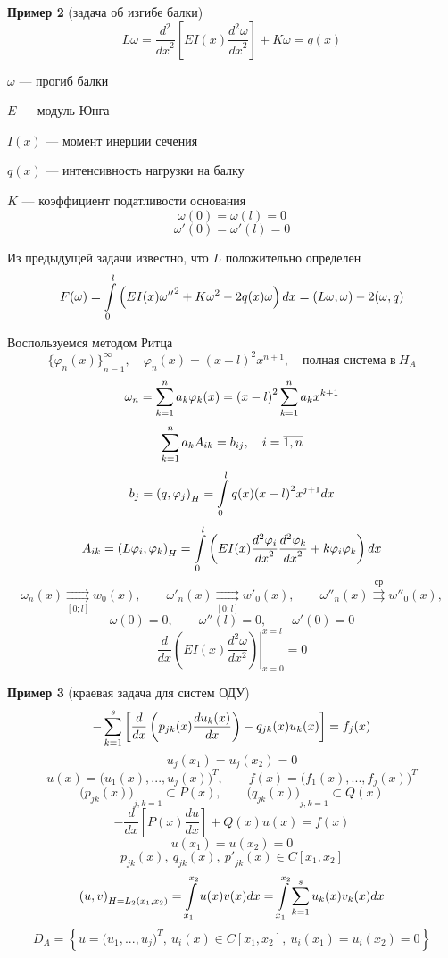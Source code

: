 \textbf{Пример 2} (задача об изгибе балки)
\[ L\omega = \frac{d^2}{{dx}^2} \left[E I(x) \frac{d^2 \omega }{{dx}^2}\right] + K\omega = q(x)\]

$ \omega $ --- прогиб балки

$ E $ --- модуль Юнга

$ I(x) $ --- момент инерции сечения

$ q(x) $ --- интенсивность нагрузки на балку

$ K $ --- коэффициент податливости основания
\[ \omega (0) = \omega (l) = 0 \]
\[ \omega'(0) = \omega'(l) = 0 \]

Из предыдущей задачи известно, что $L$ положительно определен
\[ F(\omega) = \int\limits_{0}^{l} \left(E I(x) {\omega''}^2 + K\omega^2 - 2q(x) \omega \right) dx = (L\omega , \omega) -2 (\omega, q)\]

Воспользуемся методом Ритца
\[ {\{\varphi_n (x)\}}^{\infty}_{n=1}, \quad \varphi_n (x) = {(x-l)}^2 x^{n+1}, \quad \text{полная система в} \ H_A \]
\[ \omega_n = \sum\limits_{k=1}^{n} a_k \varphi_k (x) = {(x-l)}^2 \sum\limits_{k=1}^{n} a_k x^{k+1} \]
\[ \sum\limits_{k=1}^{n} a_k A_{ik} = b_{ij}, \quad i=\overline{1, n} \]
\[ b_j = {(q, \varphi_j)}_H = \int\limits_{0}^{l } q(x) {(x-l)}^2 x^{j+1} dx \]
\[ A_{ik} = {(L \varphi_i, \varphi_k)}_H = \int\limits_{0}^{l} \left(E I(x) \frac{d^2 \varphi_i}{{dx}^2} \frac{d^2 \varphi_k}{{dx}^2} + k\varphi_i \varphi_k \right) dx \]
\[ \omega_n(x) \underset{[0;l]}{\rightrightarrows} w_0(x), \qquad {\omega'}_n(x) \underset{[0;l]}{\rightrightarrows} {w'}_0(x), \qquad {\omega''}_n(x) \overset{\text{ср}}{\rightrightarrows} {w''}_0(x), \]
\[ \omega(0) = 0, \qquad \omega''(l) = 0, \qquad \omega' (0) = 0 \]
\[ {\left.{\frac{d}{dx} \left(E I(x) \frac{d^2 \omega }{d x^2}\right)}\right|}^{x=l}_{x=0} = 0 \]

\textbf{Пример 3} (краевая задача для систем ОДУ)
\[ - \sum\limits_{k=1}^{s} \left[ \frac{d}{dx} \left( p_{jk}(x) \frac{du_k (x)}{dx} \right) - q_{jk}(x) u_k (x) \right] = f_j(x) \]
\[ u_j(x_1) = u_j(x_2) = 0 \]
\[ u(x) = {\bigl(u_1(x), ..., u_j(x)\bigr)}^T, \qquad f(x) = {\bigl(f_1(x), ..., f_j(x)\bigr)}^T \]
\[ {\bigl( p_{jk}(x) \bigr)}_{j,k=1} \subset P(x), \qquad {\bigl( q_{jk}(x) \bigr)}_{j,k=1} \subset Q(x) \]
\[ - \frac{d}{dx} \left[P(x) \frac{du}{dx} \right] + Q(x) u(x) = f(x) \]
\[ u(x_1) = u (x_2) = 0 \]
\[ p_{jk}(x), \ q_{jk}(x), \ {p'}_{jk} (x) \in C[x_1, x_2] \]
\[ {(u, v)}_{H= L_2(x_1, x_2)} = \int\limits_{x_1}^{x_2} u (x) v(x) dx = \int\limits_{x_1}^{x_2} \sum\limits_{k=1}^{s} u_k(x) v_k (x) dx \]
\[ D_A = \left\{ u = {\bigl(u_1, ..., u_j\bigr)}^T, \ u_i(x) \in C[x_1, x_2], \ u_i(x_1) = u_i(x_2) = 0 \right\} \]

